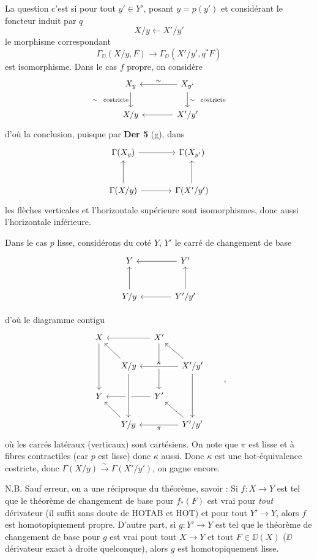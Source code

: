 \noindent{}
La question c'est si pour tout $y' \in Y'$, posant $y = p(y')$ et considérant le foncteur induit par $q$
\[
X/y \longleftarrow X'/y'
\]
le morphisme correspondant
\[
\Gamma_{\DD}(X/y, F) \longrightarrow \Gamma_{\DD}(X'/y', q^*F)
\]
est isomorphisme. Dans le cas $f$ propre, on considère
\[
\begin{tikzcd}[column sep=large]
X_y \arrow[d, "\sim\ \ \text{costricte}"'] & X_{y'} \arrow[l, "\sim"'] \arrow[d, "\sim\ \ \text{costricte}"] \\
X/y & X'/y' \arrow[l]
\end{tikzcd}
\]
d'où la conclusion, puisque par \textbf{Der 5} (g), dans
\[
\begin{tikzcd}[row sep=large, column sep=large]
\Gamma(X_y) \arrow[r] & \Gamma(X_{y'}) \\
\Gamma(X/y) \arrow[u] \arrow[r] & \Gamma(X'/y') \arrow[u]
\end{tikzcd}
\]
les flèches verticales et l'horizontale supérieure sont isomorphismes, donc aussi l'horizontale inférieure.


Dans le cas $p$ lisse, considérons du coté $Y$, $Y'$ le carré de changement de base %
\[
\begin{tikzcd}[row sep=large, column sep=large]
Y & Y' \arrow[l] \\
Y/y \arrow[u] & Y'/y' \arrow[l] \arrow[u]
\end{tikzcd}
\]

\noindent{}
d'où le diagramme contigu
\[
\begin{tikzcd}[column sep=small]
X \arrow[dd] & & X' \arrow[ll] \arrow[dd] & \\
& X/y \arrow[ul] & & X'/y' \arrow[ll, crossing over, "\kappa"'] \arrow[ul] \arrow[dd] \\
Y & & Y' \arrow[ll] & \\
& Y/y \arrow[ul] \arrow[from=uu, crossing over] & & Y'/y' \arrow[ll, "\pi"] \arrow[ul]
\end{tikzcd}
\qquad ,
\]
où les carrés latéraux (verticaux) sont cartésiens. On note que $\pi$ est lisse et à fibres contractiles (car $p$ est lisse) donc $\kappa$ aussi. Donc $\kappa$ est une hot-équivalence costricte, donc $\Gamma(X/y) \overset{\sim}{\longrightarrow} \Gamma(X'/y')$, on gagne encore.

\noindent N.B. Sauf erreur, on a une réciproque du théorème, savoir : Si $f : X \to Y$ est tel que le théorème de changement de base pour $f_*(F)$ est vrai pour \textit{tout} dérivateur (il suffit sans doute de \textsf{HOTAB} et \textsf{HOT}) et pour tout $Y' \to Y$, alors $f$ est homotopiquement propre. D'autre part, si $g : Y' \to Y$ est tel que le théorème de changement de base pour $g$ est vrai pout tout $X \to Y$ et tout $F \in \DD(X)$ ($\DD$ dérivateur exact à droite quelconque), alors $g$ est homotopiquement lisse. %

